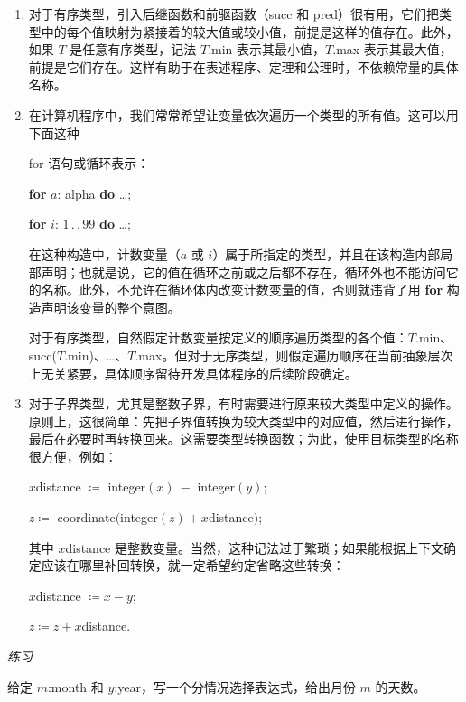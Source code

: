 \documentclass[twoside,11pt,fontset=none]{ctexbook}
\begin{document}
\begin{enumerate}[wide, nosep, label=(\arabic*)]
	\quad \textbf{if} May $\leqslant$ this month \& this month $\leqslant$ September \textbf{then}
	
	\qquad adopt summer timetables. 
	
	\noindent
	其他情况下，值的次序完全无关，对程序员没有意义。
	
	\item 对于有序类型，引入后继函数和前驱函数（succ 和 pred）很有用，它们把类型中的每个值映射为紧接着的较大值或较小值，前提是这样的值存在。此外，如果 $T$ 是任意有序类型，记法 $T$.min 表示其最小值，$T$.max 表示其最大值，前提是它们存在。这样有助于在表述程序、定理和公理时，不依赖常量的具体名称。
	\item 在计算机程序中，我们常常希望让变量依次遍历一个类型的所有值。这可以用下面这种
	
	for 语句或循环表示：
	
	\quad \textbf{for} $a$: alpha \textbf{do} \dots;
	
	\quad \textbf{for} $i$: $1\,.\,.\,99$ \textbf{do} \dots;
	
	\noindent
	在这种构造中，计数变量（$a$ 或 $i$）属于所指定的类型，并且在该构造内部局部声明；也就是说，它的值在循环之前或之后都不存在，循环外也不能访问它的名称。此外，不允许在循环体内改变计数变量的值，否则就违背了用 \textbf{for} 构造声明该变量的整个意图。
	
	对于有序类型，自然假定计数变量按定义的顺序遍历类型的各个值：$T.$min、succ($T.$min)、\dots、$T.$max。但对于无序类型，则假定遍历顺序在当前抽象层次上无关紧要，具体顺序留待开发具体程序的后续阶段确定。
	
	\item 对于子界类型，尤其是整数子界，有时需要进行原来较大类型中定义的操作。原则上，这很简单：先把子界值转换为较大类型中的对应值，然后进行操作，最后在必要时再转换回来。这需要类型转换函数；为此，使用目标类型的名称很方便，例如：
	
	\quad $x$distance $\coloneq$ integer$(x)\ -$ integer$(y)$;
	
	\quad $z \coloneq$ coordinate$($integer$(z) + x$distance$)$;
	
	\noindent
	其中 $x$distance 是整数变量。当然，这种记法过于繁琐；如果能根据上下文确定应该在哪里补回转换，就一定希望约定省略这些转换：
	
	$x$distance $\coloneq x - y$;
	
	$z \coloneq z + x$distance.
\end{enumerate}

\noindent
\textit{练习}

\noindent
给定 $m$:month 和 $y$:year，写一个分情况选择表达式，给出月份 $m$ 的天数。
\end{document}
